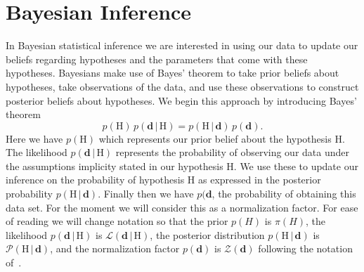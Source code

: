 \section{Bayesian Inference}\label{sec:bayes_inf}
In Bayesian statistical inference we are interested in using our data to update our beliefs regarding hypotheses and the parameters that come with these hypotheses. Bayesians make use of Bayes' theorem to take prior beliefs about hypotheses, take observations of the data, and use these observations to construct posterior beliefs about hypotheses. We begin this approach by introducing Bayes' theorem
\begin{equation} \label{eqn:BayesTheorem_basic}
     p(\mathrm{H}) \, p(\mathbf{d} \, |\, \mathrm{H})  =  p(\mathrm{H} \, | \, \mathbf{d}) \, p(\mathbf{d}).
\end{equation}
Here we have $p(\mathrm{H})$ which represents our prior belief about the hypothesis H. The likelihood $p(\mathbf{d} \, |\, \mathrm{H})$ represents the probability of observing our data under the assumptions implicity stated in our hypothesis H. We use these to update our inference on the probability of hypothesis H as expressed in the posterior probability $p(\mathrm{H} \, | \, \mathbf{d})$. Finally then we have $p(\mathbf{d}$, the probability of obtaining this data set. For the moment we will consider this as a normalization factor. For ease of reading we will change notation so that the prior $p(H)$ is $\pi (H)$, the likelihood $p(\mathbf{d} \, |\, \mathrm{H})$ is $\mathcal{L}(\mathbf{d} \, | \, \mathrm{H})$, the posterior distribution $p(\mathrm{H} \, | \, \mathbf{d})$ is $\mathcal{P}(\mathrm{H} \, | \, \mathbf{d})$, and the normalization factor $p(\mathbf{d})$ is $\mathcal{Z}(\mathbf{d})$ following the notation of~\cite{hobson2010bayesian}.

